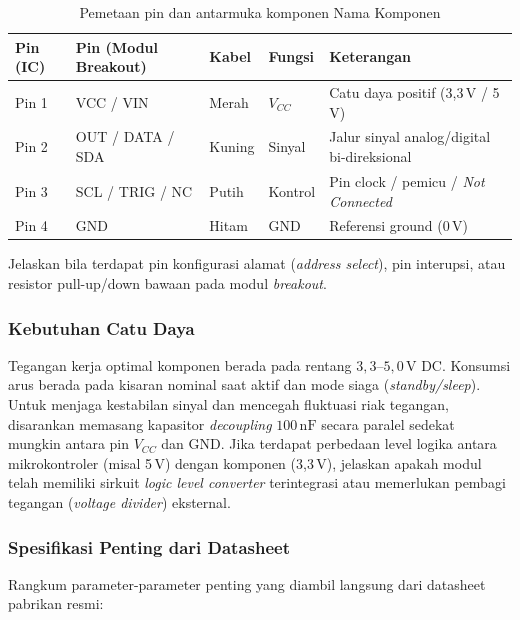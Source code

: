 \begin{table}[H]
	\centering
	\caption{Pemetaan pin dan antarmuka komponen Nama Komponen}
	\label{tab:nama_komponen_pin}
	\small
	\begin{tabularx}{\textwidth}{@{}lllXX@{}}
		\toprule
		Pin (IC) & Pin (Modul Breakout) & Kabel   & Fungsi   & Keterangan                              \\
		\midrule
		Pin 1    & VCC / VIN            & Merah   & $V_{CC}$ & Catu daya positif (3,3\,V / 5\,V)       \\
		Pin 2    & OUT / DATA / SDA     & Kuning  & Sinyal   & Jalur sinyal analog/digital bi-direksional \\
		Pin 3    & SCL / TRIG / NC      & Putih   & Kontrol  & Pin clock / pemicu / \textit{Not Connected} \\
		Pin 4    & GND                  & Hitam   & GND      & Referensi ground (0\,V)                 \\
		\bottomrule
	\end{tabularx}
\end{table}

Jelaskan bila terdapat pin konfigurasi alamat (\textit{address select}), pin interupsi,
atau resistor pull-up/down bawaan pada modul \textit{breakout}.

\subsubsection{Kebutuhan Catu Daya}
Tegangan kerja optimal komponen berada pada rentang $3{,}3\text{--}5{,}0\,\text{V DC}$.
Konsumsi arus berada pada kisaran nominal saat aktif dan mode siaga (\textit{standby/sleep}).
Untuk menjaga kestabilan sinyal dan mencegah fluktuasi riak tegangan, disarankan memasang
kapasitor \textit{decoupling} $100\,\text{nF}$ secara paralel sedekat mungkin antara pin $V_{CC}$ dan GND.
Jika terdapat perbedaan level logika antara mikrokontroler (misal 5\,V) dengan komponen (3,3\,V),
jelaskan apakah modul telah memiliki sirkuit \textit{logic level converter} terintegrasi atau
memerlukan pembagi tegangan (\textit{voltage divider}) eksternal.

\subsubsection{Spesifikasi Penting dari Datasheet}
Rangkum parameter-parameter penting yang diambil langsung dari datasheet pabrikan resmi:

